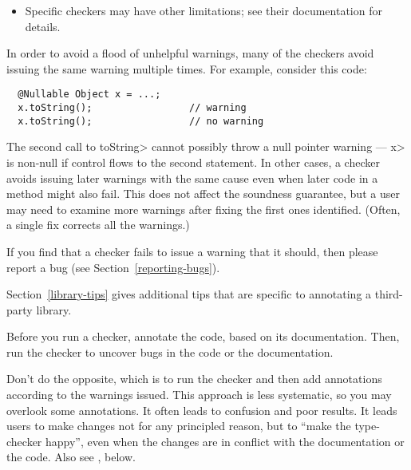 \begin{itemize}
\item
  Specific checkers may have other limitations; see their documentation for
  details.

\end{itemize}

In order to avoid a flood of unhelpful warnings, many of the checkers avoid
issuing the same warning multiple times.  For example, consider this code:

\begin{Verbatim}
  @Nullable Object x = ...;
  x.toString();                 // warning
  x.toString();                 // no warning
\end{Verbatim}

\noindent
The second call to \<toString> cannot possibly throw a null
pointer warning --- \<x> is non-null if control flows to the second
statement.
In other cases, a checker avoids issuing later warnings with the same cause
even when later code in a method might also fail.
This does not
affect the soundness guarantee, but a user may need to examine more
warnings after fixing the first ones identified.  (Often,
a single fix corrects all the warnings.)


If you find that a checker fails to issue a warning that it
should, then please report a bug (see Section~\ref{reporting-bugs}).



Section~\ref{library-tips} gives additional tips that are
specific to annotating a third-party library.



Before you run a checker, annotate the code, based on its documentation.
Then, run the checker to uncover bugs in the code or the documentation.

Don't do the opposite, which is to run the checker and then add annotations
according to the warnings issued.  This approach is less systematic, so you
may overlook some annotations.  It often leads to confusion and poor
results.  It leads users to make changes not for any principled reason, but
to ``make the type-checker happy'', even when the changes are in conflict
with the documentation or the code.  Also see
, below.


